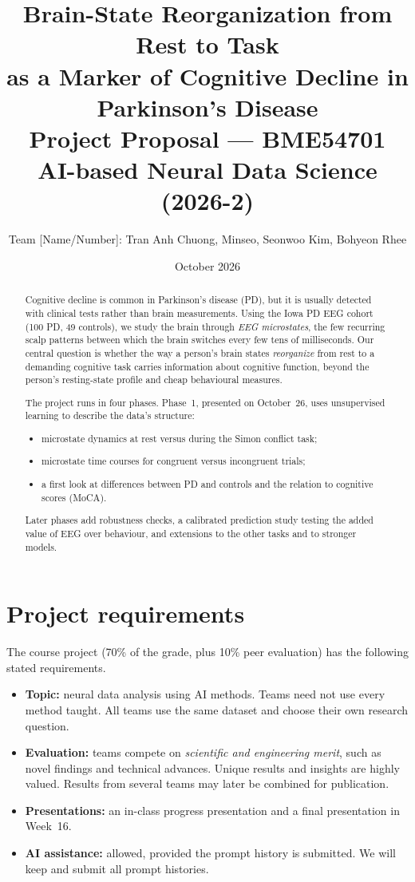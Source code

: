 \documentclass[11pt,a4paper]{article}
\title{\textbf{Brain-State Reorganization from Rest to Task\\
as a Marker of Cognitive Decline in Parkinson's Disease}\\[4pt]
\large Project Proposal --- BME54701 AI-based Neural Data Science (2026-2)}
\author{Team [Name/Number]: Tran Anh Chuong, Minseo, Seonwoo Kim, Bohyeon Rhee}
\date{October 2026}
\begin{document}
\maketitle

\begin{abstract}
\noindent
Cognitive decline is common in Parkinson's disease (PD), but it is usually detected with clinical tests rather than brain measurements. Using the Iowa PD EEG cohort (100 PD, 49 controls), we study the brain through \emph{EEG microstates}, the few recurring scalp patterns between which the brain switches every few tens of milliseconds. Our central question is whether the way a person's brain states \emph{reorganize} from rest to a demanding cognitive task carries information about cognitive function, beyond the person's resting-state profile and cheap behavioural measures.

The project runs in four phases. Phase~1, presented on October~26, uses unsupervised learning to describe the data's structure:
\begin{itemize}
  \item microstate dynamics at rest versus during the Simon conflict task;
  \item microstate time courses for congruent versus incongruent trials;
  \item a first look at differences between PD and controls and the relation to cognitive scores (MoCA).
\end{itemize}
Later phases add robustness checks, a calibrated prediction study testing the added value of EEG over behaviour, and extensions to the other tasks and to stronger models.
\end{abstract}

\section{Project requirements}

The course project (70\% of the grade, plus 10\% peer evaluation) has the following stated requirements.

\begin{itemize}
  \item \textbf{Topic:} neural data analysis using AI methods. Teams need not use every method taught. All teams use the same dataset and choose their own research question.
  \item \textbf{Evaluation:} teams compete on \emph{scientific and engineering merit}, such as novel findings and technical advances. Unique results and insights are highly valued. Results from several teams may later be combined for publication.
  \item \textbf{Presentations:} an in-class progress presentation and a final presentation in Week~16.
  \item \textbf{AI assistance:} allowed, provided the prompt history is submitted. We will keep and submit all prompt histories.
\end{itemize}
\end{document}
